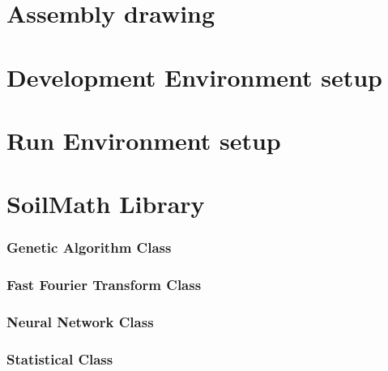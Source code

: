 \documentclass[11pt,fleqn,,a4paper,twoside,openright]{book}
\begin{document}
\chapter{Assembly drawing}\label{app:AssemblyDrawing}


\chapter{Development Environment setup}\label{SDE}

\chapter{Run Environment setup}\label{RE}


\chapter{SoilMath Library}
\subsection*{Genetic Algorithm Class}\label{app:GAclass}


\newpage
\subsection*{Fast Fourier Transform Class}\label{app:FFTclass}


\newpage
\subsection*{Neural Network Class}\label{app:NNClass}


\newpage
\subsection*{Statistical Class}\label{app:StatClass}


\newpage
\end{document}
